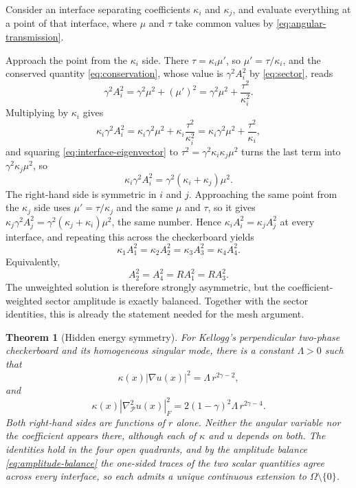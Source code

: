\documentclass[10pt,pdftex]{amsart}%
\newtheorem{thm}{Theorem}[section]
\numberwithin{equation}{section}
\newcommand{\Pcal}{\mathcal{P}}
\newcommand{\gradb}{\nabla_{\Pcal}}
\begin{document}
Consider an interface separating coefficients $\kappa_i$ and $\kappa_j$, and evaluate everything at a point of that interface, where $\mu$ and $\tau$ take common values by \eqref{eq:angular-transmission}.

Approach the point from the $\kappa_i$ side.  There $\tau=\kappa_i\mu'$, so $\mu'=\tau/\kappa_i$, and the conserved quantity \eqref{eq:conservation}, whose value is $\gamma^2A_i^2$ by \eqref{eq:sector}, reads
\[
  \gamma^2A_i^2=\gamma^2\mu^2+(\mu')^2=\gamma^2\mu^2+\frac{\tau^2}{\kappa_i^2}.
\]
Multiplying by $\kappa_i$ gives
\[
  \kappa_i\gamma^2A_i^2=\kappa_i\gamma^2\mu^2+\kappa_i\frac{\tau^2}{\kappa_i^2}
  =\kappa_i\gamma^2\mu^2+\frac{\tau^2}{\kappa_i},
\]
and squaring \eqref{eq:interface-eigenvector} to $\tau^2=\gamma^2\kappa_i\kappa_j\mu^2$ turns the last term into $\gamma^2\kappa_j\mu^2$, so
\begin{equation}\label{eq:balance-step}
  \kappa_i\gamma^2A_i^2=\gamma^2(\kappa_i+\kappa_j)\mu^2 .
\end{equation}
The right-hand side is symmetric in $i$ and $j$.  Approaching the same point from the $\kappa_j$ side uses $\mu'=\tau/\kappa_j$ and the same $\mu$ and $\tau$, so it gives $\kappa_j\gamma^2A_j^2=\gamma^2(\kappa_j+\kappa_i)\mu^2$, the same number.  Hence $\kappa_iA_i^2=\kappa_jA_j^2$ at every interface, and repeating this across the checkerboard yields
\begin{equation}\label{eq:amplitude-balance}
 \boxed{
 \kappa_1A_1^2=\kappa_2A_2^2=\kappa_3A_3^2=\kappa_4A_4^2.}
\end{equation}
Equivalently,
\begin{equation}\label{eq:amplitude-ratio}
  A_2^2=A_4^2=R A_1^2=R A_3^2.
\end{equation}
The unweighted solution is therefore strongly asymmetric, but the coefficient-weighted sector amplitude is exactly balanced.  Together with the sector identities, this is already the statement needed for the mesh argument.

\begin{thm}[Hidden energy symmetry]\label{thm:main}
For Kellogg's perpendicular two-phase checkerboard and its homogeneous singular mode, there is a constant $\Lambda>0$ such that
\begin{equation}\label{eq:main-gradient}
  \boxed{\kappa(x)|\nabla u(x)|^2=\Lambda\, r^{2\gamma-2},}
\end{equation}
and
\begin{equation}\label{eq:main-hessian}
  \boxed{\kappa(x)|\gradb^2u(x)|_F^2
  =2(1-\gamma)^2\Lambda\, r^{2\gamma-4}.}
\end{equation}
Both right-hand sides are functions of $r$ alone.  Neither the angular variable nor the coefficient appears there, although each of $\kappa$ and $u$ depends on both.  The identities hold in the four open quadrants, and by the amplitude balance \eqref{eq:amplitude-balance} the one-sided traces of the two scalar quantities agree across every interface, so each admits a unique continuous extension to $\Omega\setminus\{0\}$.
\end{thm}
\end{document}
